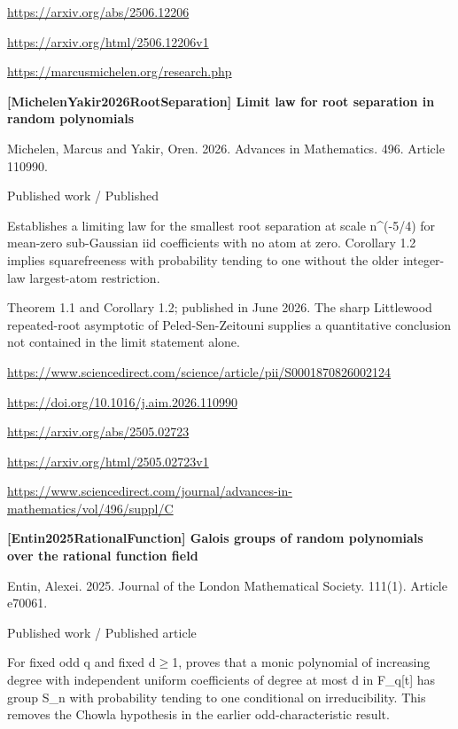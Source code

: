 \documentclass[11pt,a4paper,oneside,openany]{book}
\begin{document}
{\footnotesize\url{https://arxiv.org/abs/2506.12206}}\par
{\footnotesize\url{https://arxiv.org/html/2506.12206v1}}\par
{\footnotesize\url{https://marcusmichelen.org/research.php}}\par
\vspace{9pt}
\hypertarget{ref:MichelenYakir2026RootSeparation}{}
{\sffamily\bfseries\color{atlasgreen}[MichelenYakir2026RootSeparation] Limit law for root separation in random polynomials}\par
\color{black} Michelen, Marcus and Yakir, Oren. 2026. Advances in Mathematics. 496. Article 110990.\par
{\small\sffamily\color{atlasgold}Published work / Published}\par
\color{black} Establishes a limiting law for the smallest root separation at scale n\textasciicircum{}(-5/4) for mean-zero sub-Gaussian iid coefficients with no atom at zero. Corollary 1.2 implies squarefreeness with probability tending to one without the older integer-law largest-atom restriction.\par
{\small Theorem 1.1 and Corollary 1.2; published in June 2026. The sharp Littlewood repeated-root asymptotic of Peled-Sen-Zeitouni supplies a quantitative conclusion not contained in the limit statement alone.}\par
{\footnotesize\url{https://www.sciencedirect.com/science/article/pii/S0001870826002124}}\par
{\footnotesize\url{https://doi.org/10.1016/j.aim.2026.110990}}\par
{\footnotesize\url{https://arxiv.org/abs/2505.02723}}\par
{\footnotesize\url{https://arxiv.org/html/2505.02723v1}}\par
{\footnotesize\url{https://www.sciencedirect.com/journal/advances-in-mathematics/vol/496/suppl/C}}\par
\vspace{9pt}
\hypertarget{ref:Entin2025RationalFunction}{}
{\sffamily\bfseries\color{atlasgreen}[Entin2025RationalFunction] Galois groups of random polynomials over the rational function field}\par
\color{black} Entin, Alexei. 2025. Journal of the London Mathematical Society. 111(1). Article e70061.\par
{\small\sffamily\color{atlasgold}Published work / Published article}\par
\color{black} For fixed odd q and fixed d\ensuremath{\ge}1, proves that a monic polynomial of increasing degree with independent uniform coefficients of degree at most d in F\_\allowbreak{}q[t] has group S\_\allowbreak{}n with probability tending to one conditional on irreducibility. This removes the Chowla hypothesis in the earlier odd-characteristic result.\par
\end{document}
